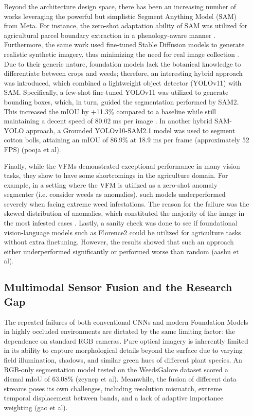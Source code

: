 Beyond the architecture design space, there has been an increasing number of works leveraging the powerful but simplistic Segment Anything Model (SAM) from Meta. For instance, the zero-shot adaptation ability of SAM was utilized for agricultural parcel boundary extraction in a phenology-aware manner \cite{simsek2026}. Furthermore, the same work used fine-tuned Stable Diffusion models to generate realistic synthetic imagery, thus minimizing the need for real image collection \cite{modak2024}. Due to their generic nature, foundation models lack the botanical knowledge to differentiate between crops and weeds; therefore, an interesting hybrid approach was introduced, which combined a lightweight object detector (YOLOv11) with SAM. Specifically, a few-shot fine-tuned YOLOv11 was utilized to generate bounding boxes, which, in turn, guided the segmentation performed by SAM2. This increased the mIOU by +11.3\% compared to a baseline while still maintaining a decent speed of 80.02 ms per image \cite{ghose2025}. In another hybrid SAM-YOLO approach, a Grounded YOLOv10-SAM2.1 model was used to segment cotton bolls, attaining an mIOU of 86.9\% at 18.9 ms per frame (approximately 52 FPS) (pooja et al).

Finally, while the VFMs demonstrated exceptional performance in many vision tasks, they show to have some shortcomings in the agriculture domain. For example, in a setting where the VFM is utilized as a zero-shot anomaly segmenter (i.e. consider weeds as anomalies), such models underperformed severely when facing extreme weed infestations. The reason for the failure was the skewed distribution of anomalies, which constituted the majority of the image in the most infested cases \cite{chong2025}. Lastly, a sanity check was done to see if foundational vision-language models such as Florence2 could be utilized for agriculture tasks without extra finetuning. However, the results showed that such an approach either underperformed significantly or performed worse than random (aashu et al).

\subsection{Multimodal Sensor Fusion and the Research Gap}
The repeated failures of both conventional CNNs and modern Foundation Models in highly occluded environments are dictated by the same limiting factor: the dependence on standard RGB cameras. Pure optical imagery is inherently limited in its ability to capture morphological details beyond the surface due to varying field illumination, shadows, and similar green hues of different plant species. An RGB-only segmentation model tested on the WeedsGalore dataset scored a dismal mIoU of 63.08\% (zeynep et al). Meanwhile, the fusion of different data streams poses its own challenges, including resolution mismatch, extreme temporal displacement between bands, and a lack of adaptive importance weighting (gao et al).

